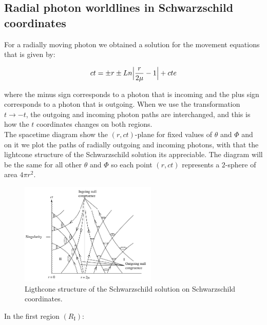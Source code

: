 \documentclass[letterpaper,11pt,onecolumn]{article}
\begin{document}
\subsection{Radial photon worldlines in Schwarzschild coordinates}
For a radially moving photon we obtained a solution for the movement equations that is given by:

\begin{equation}
ct=\pm r\pm Ln\Big| \frac{r}{2\mu}-1 \Big|+cte \label{3}\\
\end{equation}

where the minus sign corresponds to a photon that is incoming and the plus sign corresponds to a photon that is outgoing. When we use the transformation $t\rightarrow -t$, the outgoing and incoming photon paths are interchanged, and this is how the $t$ coordinates changes on both regions.\\
The spacetime diagram show the $(r,ct)$-plane for fixed values of $\theta$ and $\Phi$ and on it we plot the paths of radially outgoing and incoming photons, with that the lightcone structure of the Schwarzschild solution its appreciable. The diagram will be the same for all other $\theta$ and $\Phi$ so each point $(r,ct)$ represents a $2$-sphere of area $4\pi r^2$.
\\
\begin{figure}[h!]
    \centering
    \includegraphics[width=0.58\textwidth]{Report/Images/4bhphotons.png}
    \caption{Ligthcone structure of the Schwarzschild solution on Schwarzschild coordinates.}
\label{fig3}
\end{figure}
In the first region $(R_{\mathrm{I}})$:
\end{document}
